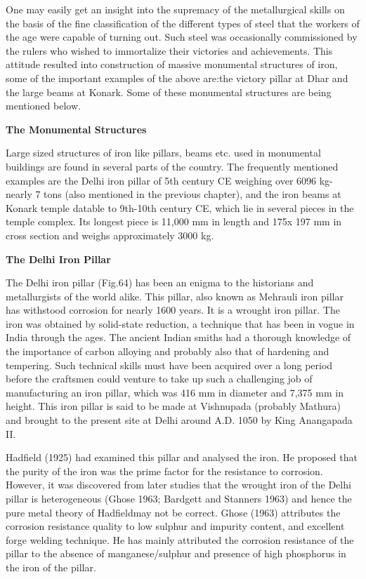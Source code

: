 One may easily get an insight into the supremacy of the metallurgical skills on the basis of the fine classification of the different types of steel that the workers of the age were capable of turning out. Such steel was occasionally commissioned by the rulers who wished to immortalize their victories and achievements. This attitude resulted into construction of massive monumental structures of iron, some of the important examples of the above are:the victory pillar at Dhar and the large beams at Konark. Some of these monumental structures are being mentioned below.

\textbf{The Monumental Structures}

Large sized structures of iron like pillars, beams etc. used in monumental buildings are found in several parts of the country. The frequently mentioned examples are the Delhi iron pillar of 5th century CE weighing over 6096 kg- nearly 7 tons (also mentioned in the previous chapter), and the iron beams at Konark temple datable to 9th-10th century CE, which lie in several pieces in the temple complex. Its longest piece is 11,000 mm in length and 175x 197 mm in cross section and weighs approximately 3000 kg.

\textbf{The Delhi Iron Pillar}

The Delhi iron pillar (Fig.64) has been an enigma to the historians and metallurgists of the world alike. This pillar, also known as Mehrauli iron pillar has withstood corrosion for nearly 1600 years. It is a wrought iron pillar. The iron was obtained by solid-state reduction, a technique that has been in vogue in India through the ages. The ancient Indian smiths had a thorough knowledge of the importance of carbon alloying and probably also that of hardening and tempering. Such technical skills must have been acquired over a long period before the craftsmen could venture to take up such a challenging job of manufacturing an iron pillar, which was 416 mm in diameter and 7,375 mm in height. This iron pillar is said to be made at Vishnupada (probably Mathura) and brought to the present site at Delhi around A.D. 1050 by King Anangapada II.

Hadfield (1925) had examined this pillar and analysed the iron. He proposed that the purity of the iron was the prime factor for the resistance to corrosion. However, it was discovered from later studies that the wrought iron of the Delhi pillar is heterogeneous (Ghose 1963; Bardgett and Stanners 1963) and hence the pure metal theory of Hadfieldmay not be correct. Ghose (1963) attributes the corrosion resistance quality to low sulphur and impurity content, and excellent forge welding technique. He has mainly attributed the corrosion resistance of the pillar to the absence of manganese/sulphur and presence of high phosphorus in the iron of the pillar.

